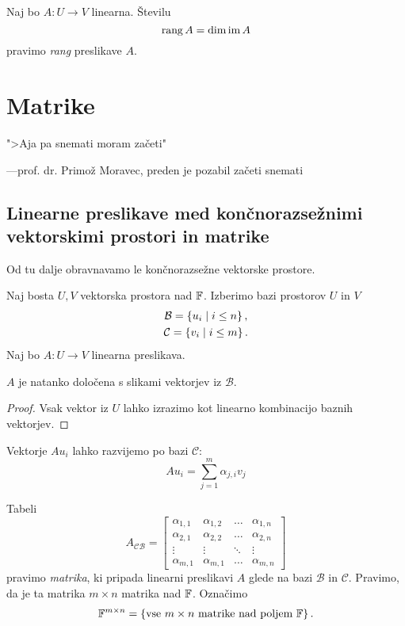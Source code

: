 \documentclass[12pt, a4paper]{article}
\begin{document}
\begin{definicija}
Naj bo $A\colon U\to V$ linearna. Številu
\[
\operatorname{rang} A=\dim\operatorname{im} A
\]
pravimo \emph{rang} preslikave $A$.
\end{definicija}

\newpage

\section{Matrike}

\epigraph{">Aja pa snemati moram začeti"}{---prof. dr. Primož Moravec, preden je pozabil začeti snemati}

\subsection{Linearne preslikave med končnorazsežnimi vektorskimi prostori in matrike}

Od tu dalje obravnavamo le končnorazsežne vektorske prostore.

Naj bosta $U,V$ vektorska prostora nad $\mathbb{F}$. Izberimo bazi prostorov $U$ in $V$
\begin{gather*}
\mathcal{B}=\left\{u_i\mid i\leq n\right\},
\\
\mathcal{C}=\left\{v_i\mid i\leq m\right\}.
\end{gather*}
Naj bo $A\colon U\to V$ linearna preslikava.

\begin{trditev}
$A$ je natanko določena s slikami vektorjev iz $\mathcal{B}$.
\end{trditev}

\begin{proof}
Vsak vektor iz $U$ lahko izrazimo kot linearno kombinacijo baznih vektorjev.
\end{proof}
Vektorje $Au_i$ lahko razvijemo po bazi $\mathcal{C}$:
\[
Au_i=\sum_{j=1}^m\alpha_{j,i}v_j
\]

\begin{okvir}
\begin{definicija}
Tabeli
\[
A_{\mathcal{CB}}=
\begin{bmatrix}
\alpha_{1,1} & \alpha_{1,2} & \dots & \alpha_{1,n} \\
\alpha_{2,1} & \alpha_{2,2} & \dots & \alpha_{2,n} \\
\vdots & \vdots & \ddots & \vdots \\
\alpha_{m,1} & \alpha_{m,1} & \dots & \alpha_{m,n}
\end{bmatrix} 
\]
pravimo \emph{matrika}, ki pripada linearni preslikavi $A$ glede na bazi $\mathcal{B}$ in $\mathcal{C}$. Pravimo, da je ta matrika $m\times n$ matrika nad $\mathbb{F}$. Označimo
\[
\mathbb{F}^{m\times n}=\left\{\text{vse $m\times n$ matrike nad poljem $\mathbb{F}$}\right\}.
\]
\end{definicija}
\end{okvir}
\end{document}
